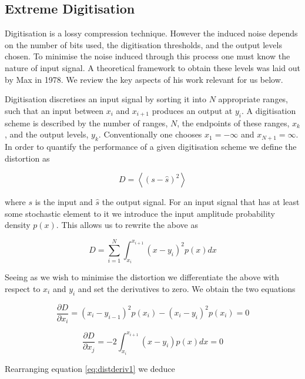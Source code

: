 \documentclass[apj]{emulateapj}
\begin{document}
\subsection{Extreme Digitisation}
\label{subsec:extremedigitisation}


Digitisation is a lossy compression technique. However the induced noise depends on the number of bits used, the digitisation thresholds, and the output levels chosen. To minimise the noise induced through this process one must know the nature of input signal. A theoretical framework to obtain these levels was laid out by Max in 1978. We review the key aspects of his work relevant for us below.

Digitisation discretises an input signal by sorting it into $N$ appropriate ranges, such that an input between $x_i$ and $x_{i+1}$ produces an output at $y_i$. A digitisation scheme is described by the number of ranges, $N$, the endpoints of these ranges, $x_k$, and the output levels, $y_k$. Conventionally one chooses $x_{1} = -\infty$ and $x_{N+1} = \infty$. In order to quantify the performance of a given digitisation scheme we define the distortion as

\[ D = \left\langle  \left( s - \hat{s} \right)^2 \right\rangle \]

where $s$ is the input and $\hat{s}$ the output signal. For an input signal that has at least some stochastic element to it we introduce the input amplitude probability density $p(x)$. This allows us to rewrite the above as

\[ D = \sum_{i = 1}^N \int_{x_i}^{x_{i+1}} \left(x-y_i\right)^2 p(x) dx \]

Seeing as we wish to minimise the distortion we differentiate the above with respect to $x_i$ and $y_i$ and set the derivatives to zero. We obtain the two equations

\begin{equation} \label{eq:distderiv1}
\frac{\partial D}{\partial x_i} = \left(x_i-y_{i-1}\right)^2 p(x_i) - \left(x_i - y_i\right)^2 p(x_i) = 0
\end{equation}

\begin{equation} \label{eq:distderiv2}
\frac{\partial D}{\partial x_j} = -2 \int_{x_i}^{x_{i+1}} \left( x-y_i \right) p(x) dx = 0
\end{equation}

Rearranging equation \ref{eq:distderiv1} we deduce
\end{document}

